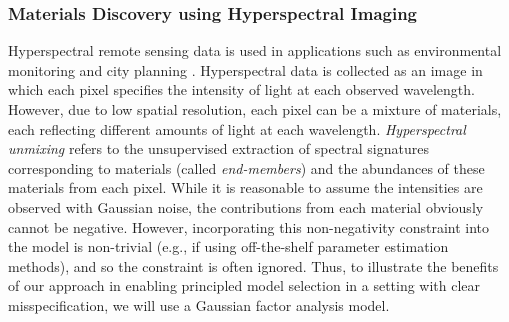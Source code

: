 \subsubsection{Materials Discovery using Hyperspectral Imaging} \label{sec:hyperspectral}

Hyperspectral remote sensing data is used in applications such as environmental monitoring and city planning \citep{Brook_Dust_over_Green_Canopy_2016,Ji_Estimatng_Vegetation_Fractional_Cover_2016,Lin_RetrievingHydrousMinerals_2017}.
Hyperspectral data is collected as an image in which each pixel specifies the intensity of light at each observed wavelength.
However, due to low spatial resolution, each pixel can be a mixture of materials,
each reflecting different amounts of light at each wavelength.
\emph{Hyperspectral unmixing} refers to the unsupervised extraction of spectral signatures corresponding to materials (called \emph{end-members}) and the abundances of these materials from each pixel.
While it is reasonable to assume the intensities are observed with Gaussian noise, the contributions from each material obviously cannot be negative.
However, incorporating this non-negativity constraint into the model is non-trivial (e.g., if using off-the-shelf parameter estimation methods),
and so the constraint is often ignored.
Thus, to illustrate the benefits of our approach in enabling principled model selection
in a setting with clear misspecification,
we will use a Gaussian factor analysis model.


